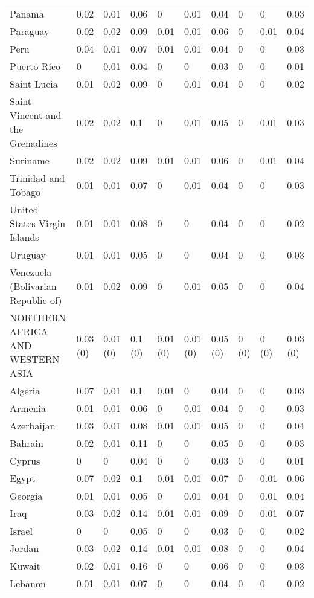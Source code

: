 \begin{longtable}[t]{llllllllll}
Panama & 0.02 & 0.01 & 0.06 & 0 & 0.01 & 0.04 & 0 & 0 & 0.03\\
Paraguay & 0.02 & 0.02 & 0.09 & 0.01 & 0.01 & 0.06 & 0 & 0.01 & 0.04\\
Peru & 0.04 & 0.01 & 0.07 & 0.01 & 0.01 & 0.04 & 0 & 0 & 0.03\\
Puerto Rico & 0 & 0.01 & 0.04 & 0 & 0 & 0.03 & 0 & 0 & 0.01\\
Saint Lucia & 0.01 & 0.02 & 0.09 & 0 & 0.01 & 0.04 & 0 & 0 & 0.02\\
Saint Vincent and the Grenadines & 0.02 & 0.02 & 0.1 & 0 & 0.01 & 0.05 & 0 & 0.01 & 0.03\\
Suriname & 0.02 & 0.02 & 0.09 & 0.01 & 0.01 & 0.06 & 0 & 0.01 & 0.04\\
Trinidad and Tobago & 0.01 & 0.01 & 0.07 & 0 & 0.01 & 0.04 & 0 & 0 & 0.03\\
United States Virgin Islands & 0.01 & 0.01 & 0.08 & 0 & 0 & 0.04 & 0 & 0 & 0.02\\
Uruguay & 0.01 & 0.01 & 0.05 & 0 & 0 & 0.04 & 0 & 0 & 0.03\\
Venezuela (Bolivarian Republic of) & 0.01 & 0.02 & 0.09 & 0 & 0.01 & 0.05 & 0 & 0 & 0.04\\
NORTHERN AFRICA AND WESTERN ASIA & 0.03 (0) & 0.01 (0) & 0.1 (0) & 0.01 (0) & 0.01 (0) & 0.05 (0) & 0 (0) & 0 (0) & 0.03 (0)\\
Algeria & 0.07 & 0.01 & 0.1 & 0.01 & 0 & 0.04 & 0 & 0 & 0.03\\
Armenia & 0.01 & 0.01 & 0.06 & 0 & 0.01 & 0.04 & 0 & 0 & 0.03\\
Azerbaijan & 0.03 & 0.01 & 0.08 & 0.01 & 0.01 & 0.05 & 0 & 0 & 0.04\\
Bahrain & 0.02 & 0.01 & 0.11 & 0 & 0 & 0.05 & 0 & 0 & 0.03\\
Cyprus & 0 & 0 & 0.04 & 0 & 0 & 0.03 & 0 & 0 & 0.01\\
Egypt & 0.07 & 0.02 & 0.1 & 0.01 & 0.01 & 0.07 & 0 & 0.01 & 0.06\\
Georgia & 0.01 & 0.01 & 0.05 & 0 & 0.01 & 0.04 & 0 & 0.01 & 0.04\\
Iraq & 0.03 & 0.02 & 0.14 & 0.01 & 0.01 & 0.09 & 0 & 0.01 & 0.07\\
Israel & 0 & 0 & 0.05 & 0 & 0 & 0.03 & 0 & 0 & 0.02\\
Jordan & 0.03 & 0.02 & 0.14 & 0.01 & 0.01 & 0.08 & 0 & 0 & 0.04\\
Kuwait & 0.02 & 0.01 & 0.16 & 0 & 0 & 0.06 & 0 & 0 & 0.03\\
Lebanon & 0.01 & 0.01 & 0.07 & 0 & 0 & 0.04 & 0 & 0 & 0.02\\

\end{longtable}
